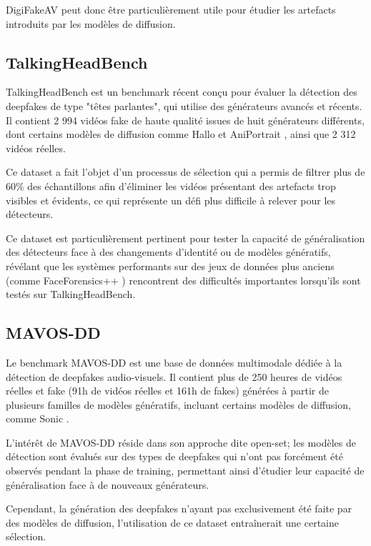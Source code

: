\documentclass[runningheads]{llncs}
\begin{document}
DigiFakeAV peut donc être particulièrement utile pour étudier les artefacts introduits par les modèles de diffusion.

\subsection{TalkingHeadBench}

TalkingHeadBench \citep{xiong} est un benchmark récent conçu pour évaluer la détection des deepfakes de type "têtes parlantes", qui utilise des générateurs avancés et récents. Il contient 2 994 vidéos fake de haute qualité issues de huit générateurs différents, dont certains modèles de diffusion comme Hallo \citep{xu2024} et AniPortrait \citep{wei}, ainsi que 2 312 vidéos réelles.

Ce dataset a fait l'objet d'un processus de sélection qui a permis de filtrer plus de 60\% des échantillons afin d'éliminer les vidéos présentant des artefacts trop visibles et évidents, ce qui représente un défi plus difficile à relever pour les détecteurs.

Ce dataset est particulièrement pertinent pour tester la capacité de généralisation des détecteurs face à des changements d'identité ou de modèles génératifs, révélant que les systèmes performants sur des jeux de données plus anciens (comme FaceForensics++ \citep{rossler2019faceforensics}) rencontrent des difficultés importantes lorsqu'ils sont testés sur TalkingHeadBench.

\subsection{MAVOS-DD}

Le benchmark MAVOS-DD \citep{croitoru} est une base de données multimodale dédiée à la détection de deepfakes audio-visuels. Il contient plus de 250 heures de vidéos réelles et fake (91h de vidéos réelles et 161h de fakes) générées à partir de plusieurs familles de modèles génératifs, incluant certains modèles de diffusion, comme Sonic \citep{ji}.

L’intérêt de MAVOS-DD réside dans son approche dite open-set; les modèles de détection sont évalués sur des types de deepfakes qui n’ont pas forcément été observés pendant la phase de training, permettant ainsi d’étudier leur capacité de généralisation face à de nouveaux générateurs.

Cependant, la génération des deepfakes n'ayant pas exclusivement été faite par des modèles de diffusion, l'utilisation de ce dataset entraînerait une certaine sélection.
\end{document}
